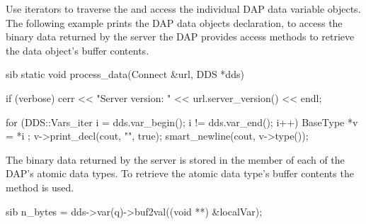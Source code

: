 \documentclass{dods-paper}
\begin{document}






Use iterators to traverse the  and access the individual DAP
data variable objects. The following example
prints the DAP data objects declaration, to access the binary data returned
by the server the DAP provides access methods to retrieve the data object's
buffer contents.

\begin{vcode}{sib}
static void
process_data(Connect &url, DDS *dds)
{
   if (verbose)
       cerr << "Server version: " << url.server_version() << endl;

   for (DDS::Vars_iter i = dds.var_begin(); i != dds.var_end(); i++) {
       BaseType *v = *i ;
       v->print_decl(cout, "", true);
       smart_newline(cout, v->type());
   }
}
\end{vcode}

The binary data returned by the server is stored in the  member of
each of the DAP's atomic data types. To retrieve the atomic data type's
buffer contents the  method is used.

\begin{vcode}{sib}
n_bytes = dds->var(q)->buf2val((void **) &localVar);
\end{vcode}

\end{document}
